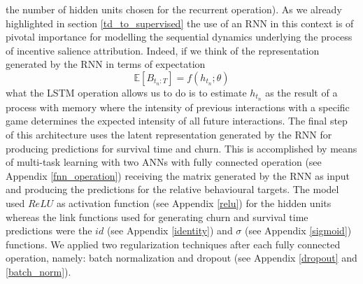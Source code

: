 the number of hidden units chosen for the recurrent operation). As we already highlighted in section \ref{td_to_supervised} the use of an RNN in this context is of pivotal importance for modelling the sequential dynamics underlying the process of incentive salience attribution. Indeed, if we think of the representation generated by the RNN in terms of expectation
\begin{equation}
\label{rnn_1_exp}
   \mathbb{E}[B_{t_n : T}] = f(h_{t_n}; \theta)
\end{equation}
what the LSTM operation allows us to do is to estimate $h_{t_n}$ as the result of a process with memory where the intensity of previous interactions with a specific game determines the expected intensity of all future interactions. The final step of this architecture uses the latent representation generated by the RNN for producing predictions for survival time and churn. This is accomplished by means of multi-task learning with two ANNs with fully connected operation (see Appendix \ref{fnn_operation}) receiving the matrix generated by the RNN as input and producing the predictions for the relative behavioural targets. The model used $ReLU$ as activation function (see Appendix \ref{relu}) for the hidden units whereas the link functions used for generating churn and survival time predictions were the $id$ (see Appendix \ref{identity}) and $\sigma$ (see Appendix \ref{sigmoid}) functions. We applied two regularization techniques after each fully connected operation, namely: batch normalization \cite{ioffe2015batch} and dropout \cite{srivastava2014dropout} (see Appendix \ref{dropout} and \ref{batch_norm}).

